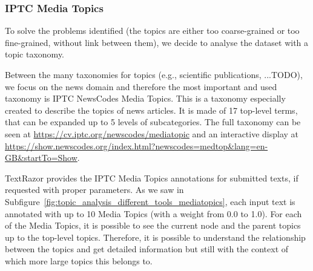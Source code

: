 




\subsubsection{\statusgreen IPTC Media Topics}

To solve the problems identified (the topics are either too coarse-grained or too fine-grained, without link between them), we decide to analyse the dataset with a topic taxonomy.

Between the many taxonomies for topics (e.g., scientific publications, ...TODO), we focus on the news domain and therefore the most important and used taxonomy is IPTC NewsCodes Media Topics.
This is a taxonomy especially created to describe the topics of news articles. It is made of 17 top-level terms, that can be expanded up to 5 levels of subcategories.
The full taxonomy can be seen at \url{https://cv.iptc.org/newscodes/mediatopic} and an interactive display at \url{https://show.newscodes.org/index.html?newscodes=medtop&lang=en-GB&startTo=Show}.




TextRazor provides the IPTC Media Topics annotations for submitted texts, if requested with proper parameters.
As we saw in Subfigure~\ref{fig:topic_analysis_different_tools_mediatopics}, each input text is annotated with up to 10 Media Topics (with a weight from 0.0 to 1.0). For each of the Media Topics, it is possible to see the current node and the parent topics up to the top-level topics.
Therefore, it is possible to understand the relationship between the topics and get detailed information but still with the context of which more large topics this belongs to.


